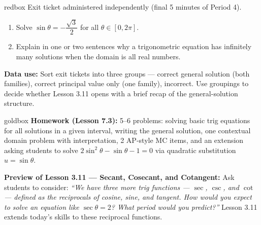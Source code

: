 \documentclass[10pt]{article}
\begin{document}
\vspace{0.08in}

\begin{skillbox}{redbox}
Exit ticket administered independently (final 5 minutes of Period 4).

\begin{enumerate}[leftmargin=1.4em, itemsep=4pt]
  \item Solve $\sin\theta = -\dfrac{\sqrt{3}}{2}$ for all $\theta \in [0, 2\pi]$.
  \item Explain in one or two sentences why a trigonometric equation has
    infinitely many solutions when the domain is all real numbers.
\end{enumerate}

\textbf{Data use:} Sort exit tickets into three groups --- correct general
solution (both families), correct principal value only (one family), incorrect.
Use groupings to decide whether Lesson 3.11 opens with a brief recap of the
general-solution structure.
\end{skillbox}

\vspace{0.08in}

\begin{skillbox}{goldbox}
\textbf{Homework (Lesson 7.3):} 5--6 problems: solving basic trig equations
for all solutions in a given interval, writing the general solution, one
contextual domain problem with interpretation, 2 AP-style MC items, and an
extension asking students to solve $2\sin^2\theta - \sin\theta - 1 = 0$ via
quadratic substitution $u = \sin\theta$.

\textbf{Preview of Lesson 3.11 --- Secant, Cosecant, and Cotangent:}
Ask students to consider: \textit{``We have three more trig functions ---
$\sec$, $\csc$, and $\cot$ --- defined as the reciprocals of cosine, sine,
and tangent. How would you expect to solve an equation like $\sec\theta = 2$?
What period would you predict?''} Lesson 3.11 extends today's skills to these
reciprocal functions.
\end{skillbox}
\end{document}
